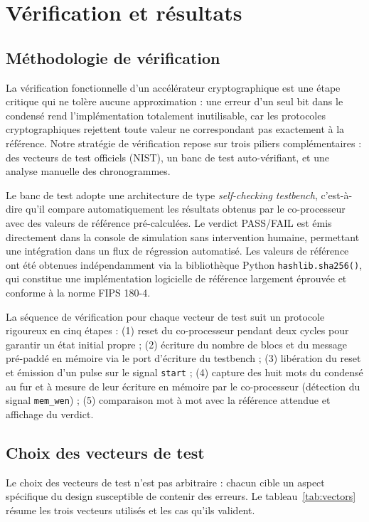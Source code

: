 \section{Vérification et résultats}
\label{sec:verif}

\subsection{Méthodologie de vérification}

La vérification fonctionnelle d'un accélérateur cryptographique est une étape critique qui ne tolère aucune approximation : une erreur d'un seul bit dans le condensé rend l'implémentation totalement inutilisable, car les protocoles cryptographiques rejettent toute valeur ne correspondant pas exactement à la référence. Notre stratégie de vérification repose sur trois piliers complémentaires : des vecteurs de test officiels (NIST), un banc de test auto-vérifiant, et une analyse manuelle des chronogrammes.

Le banc de test adopte une architecture de type \emph{self-checking testbench}, c'est-à-dire qu'il compare automatiquement les résultats obtenus par le co-processeur avec des valeurs de référence pré-calculées. Le verdict PASS/FAIL est émis directement dans la console de simulation sans intervention humaine, permettant une intégration dans un flux de régression automatisé. Les valeurs de référence ont été obtenues indépendamment via la bibliothèque Python \texttt{hashlib.sha256()}, qui constitue une implémentation logicielle de référence largement éprouvée et conforme à la norme FIPS 180-4.

La séquence de vérification pour chaque vecteur de test suit un protocole rigoureux en cinq étapes : (1) reset du co-processeur pendant deux cycles pour garantir un état initial propre ; (2) écriture du nombre de blocs et du message pré-paddé en mémoire via le port d'écriture du testbench ; (3) libération du reset et émission d'un pulse sur le signal \texttt{start} ; (4) capture des huit mots du condensé au fur et à mesure de leur écriture en mémoire par le co-processeur (détection du signal \texttt{mem\_wen}) ; (5) comparaison mot à mot avec la référence attendue et affichage du verdict.

\subsection{Choix des vecteurs de test}

Le choix des vecteurs de test n'est pas arbitraire : chacun cible un aspect spécifique du design susceptible de contenir des erreurs. Le tableau~\ref{tab:vectors} résume les trois vecteurs utilisés et les cas qu'ils valident.

